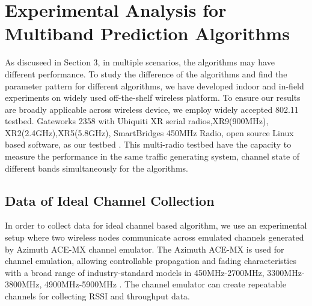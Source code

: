 \section{Experimental Analysis for Multiband Prediction Algorithms}
\label{sec:experiment design}


As discuseed in Section 3, in multiple scenarios, the algorithms may have different performance. To study the difference of the algorithms and find the parameter pattern for different algorithms, we have developed indoor and in-field experiments 
on widely used off-the-shelf wireless platform.
To ensure our results are broadly applicable across wireless device, we employ widely accepted 802.11 testbed. Gateworks 2358 with Ubiquiti XR serial radios,XR9(900MHz), XR2(2.4GHz),XR5(5.8GHz), SmartBridges 450MHz Radio, open source Linux based software, as our testbed \cite{Gateworks,Ubnt,Openwrt}. 
This multi-radio testbed have the capacity to measure the performance in the same traffic generating system, channel state of different bands simultaneously for the algorithms.


\subsection{Data of Ideal Channel Collection}

In order to collect data for ideal channel based algorithm, we use an experimental setup where two wireless nodes communicate across emulated channels generated by Azimuth ACE-MX channel emulator. 
The Azimuth ACE-MX is used for channel emulation, allowing controllable propagation and fading characteristics with a broad range of industry-standard models in 450MHz-2700MHz, 3300MHz-3800MHz, 4900MHz-5900MHz \cite{AzimuthACE}. 
The channel emulator can create repeatable channels for collecting RSSI and throughput data.

